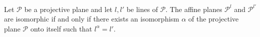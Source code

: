 Let $\mathcal{P}$ be a projective plane and let $l, l'$ be lines of $\mathcal{P}$. The affine planes $\mathcal{P}^l$ and $\mathcal{P}^{l'}$ are isomorphic if and only if there exists an isomorphism $\alpha$ of the projective plane $\mathcal{P}$ onto itself such that $l^\alpha = l'$.
